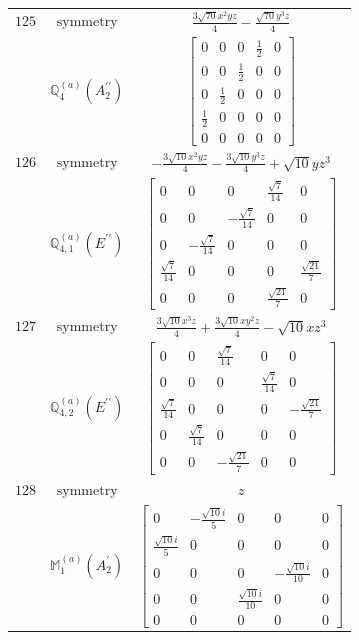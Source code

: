 \documentclass[fleqn,8pt,landscape]{jsarticle}
\begin{document}
\begin{longtable}{ccc}
$ 125 $ & $ \text{symmetry} $ & $ \frac{3 \sqrt{70} x^{2} y z}{4} - \frac{\sqrt{70} y^{3} z}{4} $ \\
$  $ & $ \mathbb{Q}_{4}^{(a)}(A_{2}^{\prime\prime}) $ & $ \begin{bmatrix} 0 & 0 & 0 & \frac{1}{2} & 0 \\ 0 & 0 & \frac{1}{2} & 0 & 0 \\ 0 & \frac{1}{2} & 0 & 0 & 0 \\ \frac{1}{2} & 0 & 0 & 0 & 0 \\ 0 & 0 & 0 & 0 & 0 \end{bmatrix} $ \\ \hline
$ 126 $ & $ \text{symmetry} $ & $ - \frac{3 \sqrt{10} x^{2} y z}{4} - \frac{3 \sqrt{10} y^{3} z}{4} + \sqrt{10} y z^{3} $ \\
$  $ & $ \mathbb{Q}_{4,1}^{(a)}(E^{\prime\prime}) $ & $ \begin{bmatrix} 0 & 0 & 0 & \frac{\sqrt{7}}{14} & 0 \\ 0 & 0 & - \frac{\sqrt{7}}{14} & 0 & 0 \\ 0 & - \frac{\sqrt{7}}{14} & 0 & 0 & 0 \\ \frac{\sqrt{7}}{14} & 0 & 0 & 0 & \frac{\sqrt{21}}{7} \\ 0 & 0 & 0 & \frac{\sqrt{21}}{7} & 0 \end{bmatrix} $ \\ \hline
$ 127 $ & $ \text{symmetry} $ & $ \frac{3 \sqrt{10} x^{3} z}{4} + \frac{3 \sqrt{10} x y^{2} z}{4} - \sqrt{10} x z^{3} $ \\
$  $ & $ \mathbb{Q}_{4,2}^{(a)}(E^{\prime\prime}) $ & $ \begin{bmatrix} 0 & 0 & \frac{\sqrt{7}}{14} & 0 & 0 \\ 0 & 0 & 0 & \frac{\sqrt{7}}{14} & 0 \\ \frac{\sqrt{7}}{14} & 0 & 0 & 0 & - \frac{\sqrt{21}}{7} \\ 0 & \frac{\sqrt{7}}{14} & 0 & 0 & 0 \\ 0 & 0 & - \frac{\sqrt{21}}{7} & 0 & 0 \end{bmatrix} $ \\ \hline
$ 128 $ & $ \text{symmetry} $ & $ z $ \\
$  $ & $ \mathbb{M}_{1}^{(a)}(A_{2}^{\prime}) $ & $ \begin{bmatrix} 0 & - \frac{\sqrt{10} i}{5} & 0 & 0 & 0 \\ \frac{\sqrt{10} i}{5} & 0 & 0 & 0 & 0 \\ 0 & 0 & 0 & - \frac{\sqrt{10} i}{10} & 0 \\ 0 & 0 & \frac{\sqrt{10} i}{10} & 0 & 0 \\ 0 & 0 & 0 & 0 & 0 \end{bmatrix} $ \\ \hline

\end{longtable}
\end{document}
